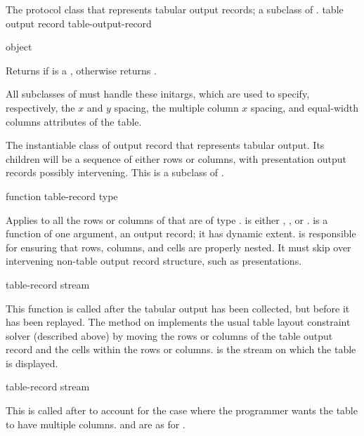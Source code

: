 
The protocol class that represents tabular output records; a subclass of
.
 {table output record} {table-output-record}

 {object}

Returns  if  is a , otherwise
returns .


All subclasses of  must handle these initargs, which are
used to specify, respectively, the $x$ and $y$ spacing, the multiple column $x$
spacing, and equal-width columns attributes of the table.


The instantiable class of output record that represents tabular output.  Its
children will be a sequence of either rows or columns, with presentation output
records possibly intervening.  This is a subclass of .

 {function table-record type}

Applies  to all the rows or columns of  that
are of type .   is either , , or
.   is a function of one argument, an output
record; it has dynamic extent.   is responsible
for ensuring that rows, columns, and cells are properly nested.  It must skip
over intervening non-table output record structure, such as presentations.

 {table-record stream}

This function is called after the tabular output has been collected, but before
it has been replayed.  The method on 
implements the usual table layout constraint solver (described above) by moving
the rows or columns of the table output record  and the cells
within the rows or columns.     is the stream on which the table is
displayed.

 {table-record stream}

This is called after  to account for the case where the
programmer wants the table to have multiple columns.   and
 are as for .


